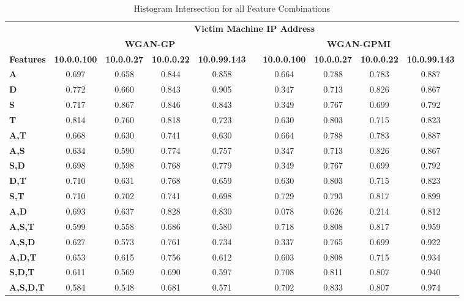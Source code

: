 \begin{table}[!htbp]
	\caption{Histogram Intersection for all Feature Combinations}
	\label{tab:inter}
	\centering
	\begin{adjustbox}{angle=90}
	\begin{tabular}{l|c|c|c|c|c|c|c|c|c|}
		\multicolumn{1}{c|}{} & \multicolumn{9}{c|}{\textbf{Victim Machine IP Address}} \\
		\multicolumn{1}{c|}{} & \multicolumn{4}{c|}{\textbf{WGAN-GP}} &  & \multicolumn{4}{c|}{\textbf{WGAN-GPMI}} \\
		\multicolumn{1}{c|}{\textbf{Features}} & \textbf{10.0.0.100} & \textbf{10.0.0.27} & \textbf{10.0.0.22} & \textbf{10.0.99.143} & \textbf{} & \textbf{10.0.0.100} & \textbf{10.0.0.27} & \textbf{10.0.0.22} & \textbf{10.0.99.143} \\ \hline
		\textbf{A} & 0.697 & 0.658 & 0.844 & 0.858 &  & 0.664 & 0.788 & 0.783 & 0.887 \\
		\textbf{D} & 0.772 & 0.660 & 0.843 & 0.905 &  & 0.347 & 0.713 & 0.826 & 0.867 \\
		\textbf{S} & 0.717 & 0.867 & 0.846 & 0.843 &  & 0.349 & 0.767 & 0.699 & 0.792 \\
		\textbf{T} & 0.814 & 0.760 & 0.818 & 0.723 &  & 0.630 & 0.803 & 0.715 & 0.823 \\ \hline
		\textbf{A,T} & 0.668 & 0.630 & 0.741 & 0.630 &  & 0.664 & 0.788 & 0.783 & 0.887 \\
		\textbf{A,S} & 0.634 & 0.590 & 0.774 & 0.757 &  & 0.347 & 0.713 & 0.826 & 0.867 \\
		\textbf{S,D} & 0.698 & 0.598 & 0.768 & 0.779 &  & 0.349 & 0.767 & 0.699 & 0.792 \\
		\textbf{D,T} & 0.710 & 0.631 & 0.768 & 0.659 &  & 0.630 & 0.803 & 0.715 & 0.823 \\
		\textbf{S,T} & 0.710 & 0.702 & 0.741 & 0.698 &  & 0.729 & 0.793 & 0.817 & 0.899 \\
		\textbf{A,D} & 0.693 & 0.637 & 0.828 & 0.830 &  & 0.078 & 0.626 & 0.214 & 0.812 \\ \hline
		\textbf{A,S,T} & 0.599 & 0.558 & 0.686 & 0.580 &  & 0.718 & 0.808 & 0.817 & 0.959 \\
		\textbf{A,S,D} & 0.627 & 0.573 & 0.761 & 0.734 &  & 0.337 & 0.765 & 0.699 & 0.922 \\
		\textbf{A,D,T} & 0.653 & 0.615 & 0.756 & 0.612 &  & 0.603 & 0.808 & 0.715 & 0.934 \\
		\textbf{S,D,T} & 0.611 & 0.569 & 0.690 & 0.597 &  & 0.708 & 0.811 & 0.807 & 0.940 \\ \hline
		\textbf{A,S,D,T} & 0.584 & 0.548 & 0.681 & 0.571 &  & 0.702 & 0.833 & 0.807 & 0.974 \\
	\end{tabular}
	\end{adjustbox}
\end{table}

